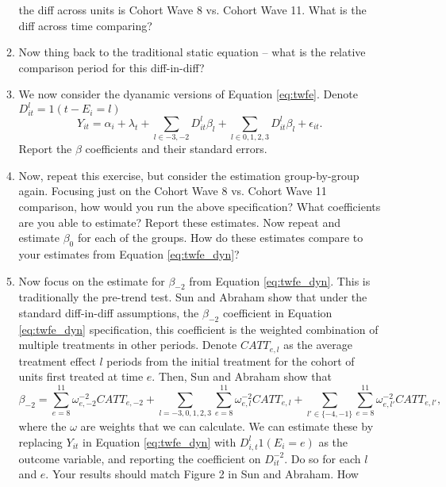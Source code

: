 \documentclass[11pt, a4paper]{article}
\begin{document}
\begin{enumerate}
\begin{enumerate}
        the diff across units is Cohort Wave 8 vs. Cohort Wave 11. What is the diff
        across time comparing?
      \item Now thing back to the traditional static equation -- what is
        the relative comparison period for this diff-in-diff? 
      \item We now consider the dyanamic versions of Equation
        \ref{eq:twfe}. Denote $D_{it}^{l} = 1(t - E_{i} = l)$
        \begin{equation}\label{eq:twfe_dyn}
          Y_{it} = \alpha_{i} + \lambda_{t} + \sum_{l \in -3,-2} D^{l}_{it}\beta_{l} +  \sum_{l \in 0,1,2,3} D^{l}_{it}\beta_{l} + \epsilon_{it}.
        \end{equation}
        Report the $\beta$ coefficients and their standard errors.
      \item Now, repeat this exercise, but consider the estimation
        group-by-group again. Focusing just on the Cohort Wave 8
        vs. Cohort Wave 11 comparison, how would you run the above
        specification? What coefficients are you able to estimate? Report
        these estimates. Now repeat and estimate $\beta_{0}$ for each of
        the groups. How do these estimates compare to your estimates from
        Equation \ref{eq:twfe_dyn}?
      \item Now focus on the estimate for $\beta_{-2}$ from Equation
        \ref{eq:twfe_dyn}. This is traditionally the pre-trend test. Sun
        and Abraham show that under the standard diff-in-diff assumptions,
        the $\beta_{-2}$ coefficient in Equation \ref{eq:twfe_dyn}
        specification, this coefficient is the weighted combination of
        multiple treatments in other periods. Denote $CATT_{e,l}$ as the
        average treatment effect $l$ periods from the initial treatment
        for the cohort of units first treated at time $e$. Then, Sun and Abraham show that
        \begin{equation}
          \beta_{-2} = \sum_{e=8}^{11}\omega_{e,-2}^{-2}CATT_{e,-2} + \sum_{l=-3,0,1,2,3}\sum_{e=8}^{11}\omega_{e,l}^{-2}CATT_{e,l} + \sum_{l'\in\{-4,-1\}}\sum_{e=8}^{11}\omega_{e,l'}^{-2}CATT_{e,l'}, 
        \end{equation}
        where the $\omega$ are weights that we can calculate. We can
        estimate these by replacing $Y_{it}$ in Equation \ref{eq:twfe_dyn}
        with $D_{i,t}^{l}1(E_{i}=e)$ as the outcome variable, and
        reporting the coefficient on $D^{-2}_{it}$. Do so for each $l$ and
        $e$. Your results should match Figure 2 in Sun and Abraham. How

\end{enumerate}
\end{enumerate}
\end{document}
